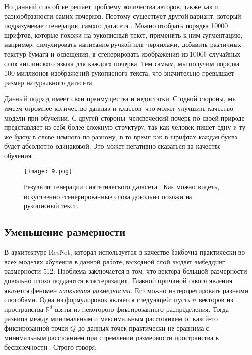 Но данный способ не решает проблему количества авторов, также как и разнообразности самих почерков. Поэтому существует другой вариант, который подразумевает генерацию самого датасета \cite{font}. Можно отобрать порядка 10000 шрифтов, которые похожи на рукописный текст, применить к ним аугментацию, например, симулировать написание ручкой или чернилами, добавить различных текстур бумаги и освещения, и сгенерировать изображения из 10000 случайных слов английского языка для каждого почерка. Тем самым, мы получим порядка 100 миллионов изображений рукописного текста, что значительно превышает размер натурального датасета.

Данный подход имеет свои преимущества и недостатки. С одной стороны, мы имеем огромное количество данных и классов, что может улучшить качество модели при обучении. С другой стороны, человеческий почерк по своей природе представляет из себя более сложную структуру, так как человек пишет одну и ту же букву в слове немного по разному, в то время как в шрифтах каждая буква будет абсолютно одинаковой. Это может негативно сказаться на качестве обучения.

\begin{figure}[htbp]
    \centering
    \texttt{[image: 9.png]}
    \captionsetup{width=0.9\textwidth}
    \caption{Результат генерации синтетического датасета \cite{font}. Как можно видеть, искуственно сгенерированные слова довольно похожи на рукописный текст.}
    \label{fig:font}
\end{figure}

\subsection{Уменьшение размерности}

В архитектуре ResNet, которая используется в качестве бэкбоуна практически во всех моделях обучения в данной работе, выходной слой выдает эмбеддинг размерности 512. Проблема заключается в том, что вектора большой размерности довольно плохо поддаются кластеризации. Главной причиной такого явления является феномен \textit{проклятия размерности}. Его можно интерпретировать разными способами. Одна из формулировок является следующей: пусть $n$ векторов из пространства $\mathbb{R}^d$ взяты из некоторого фиксированного распределения. Тогда разница между минимальным и максимальным расстоянием от какой-то фиксированной точки $Q$ до данных точек практически не сравнима с минимальным расстоянием при стремлении размерности пространства к бесконечности \cite{bellman1957dynamic}. Строго говоря:

